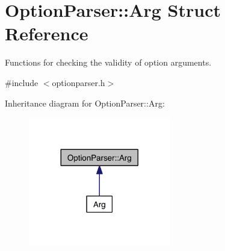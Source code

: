 \hypertarget{struct_option_parser_1_1_arg}{\section{Option\-Parser\-:\-:Arg Struct Reference}
\label{struct_option_parser_1_1_arg}
}


Functions for checking the validity of option arguments.  




{\ttfamily \#include $<$optionparser.\-h$>$}



Inheritance diagram for Option\-Parser\-:\-:Arg\-:\nopagebreak
\begin{figure}[H]
\begin{center}
\leavevmode
\includegraphics[width=176pt]{struct_option_parser_1_1_arg__inherit__graph}
\end{center}
\end{figure}
